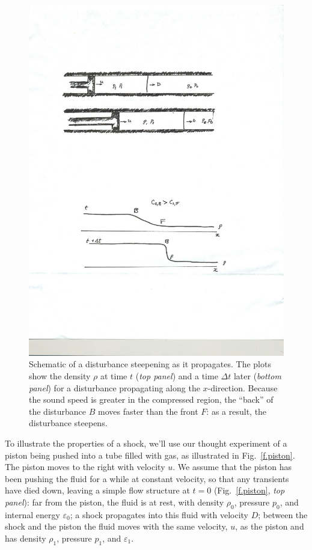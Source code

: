 \begin{figure}[htbp]
\includegraphics[width=\textwidth]{shock-formation}
\caption{Schematic of a disturbance steepening as it propagates.  The plots show the density $\rho$ at time $t$ (\emph{top panel}) and a time $\Delta t$ later (\emph{bottom panel}) for a disturbance propagating along the $x$-direction.  Because the sound speed is greater in the compressed region, the ``back'' of the disturbance $B$ moves faster than the front $F$: as a result, the disturbance steepens. }
\label{f.steepening}
\end{figure}

To illustrate the properties of a shock, we'll use our thought experiment of a piston being pushed into a tube filled with gas, as illustrated in Fig.~\ref{f.piston}.  The piston moves to the right with velocity $u$.  We assume that the piston has been pushing the fluid for a while at constant velocity, so that any transients have died down, leaving a simple flow structure at $t=0$ (Fig.~\ref{f.piston}, \emph{top panel}): far from the piston, the fluid is at rest, with density $\rho_{0}$, pressure $p_{0}$, and internal energy $\varepsilon_{0}$; a shock propagates into this fluid with velocity $D$; between the shock and the piston the fluid moves with the same velocity, $u$, as the piston and has density $\rho_{1}$, pressure $p_{1}$, and $\varepsilon_{1}$.

